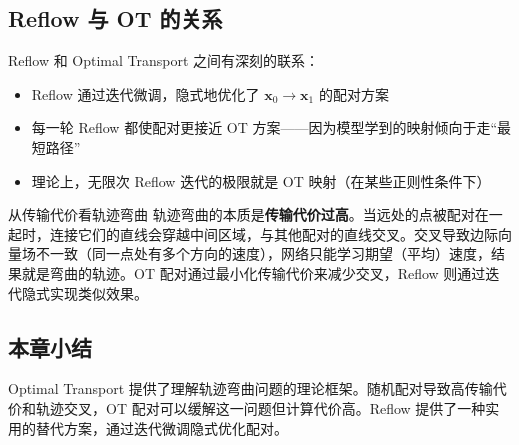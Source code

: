 \subsection{Reflow 与 OT 的关系}

Reflow 和 Optimal Transport 之间有深刻的联系：

\begin{itemize}
    \item Reflow 通过迭代微调，隐式地优化了 $\mathbf{x}_0 \to \mathbf{x}_1$ 的配对方案
    \item 每一轮 Reflow 都使配对更接近 OT 方案——因为模型学到的映射倾向于走``最短路径''
    \item 理论上，无限次 Reflow 迭代的极限就是 OT 映射（在某些正则性条件下）
\end{itemize}

\begin{knowledgebox}{从传输代价看轨迹弯曲}
轨迹弯曲的本质是\textbf{传输代价过高}。当远处的点被配对在一起时，连接它们的直线会穿越中间区域，与其他配对的直线交叉。交叉导致边际向量场不一致（同一点处有多个方向的速度），网络只能学习期望（平均）速度，结果就是弯曲的轨迹。OT 配对通过最小化传输代价来减少交叉，Reflow 则通过迭代隐式实现类似效果。
\end{knowledgebox}

\subsection{本章小结}

Optimal Transport 提供了理解轨迹弯曲问题的理论框架。随机配对导致高传输代价和轨迹交叉，OT 配对可以缓解这一问题但计算代价高。Reflow 提供了一种实用的替代方案，通过迭代微调隐式优化配对。

